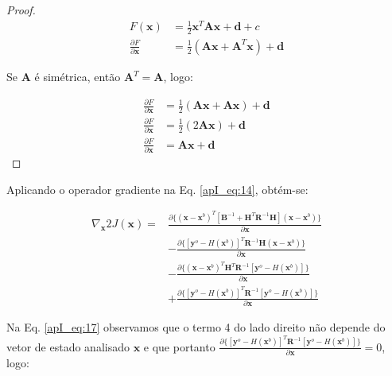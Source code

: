 \begin{proof}
\begin{align*}
    F(\mathbf{x}) &= \frac{1}{2}\mathbf{x}^{T}\mathbf{A}\mathbf{x} + \mathbf{d} + c \\
    \frac{\partial F}{\partial \mathbf{x}} &= \frac{1}{2}(\mathbf{A}\mathbf{x} + \mathbf{A}^{T}\mathbf{x}) + \mathbf{d}
\end{align*}


Se $\mathbf{A}$ é simétrica, então $\mathbf{A}^{T} = \mathbf{A}$, logo:

\begin{align*}
    \frac{\partial F}{\partial \mathbf{x}} &= \frac{1}{2}(\mathbf{A}\mathbf{x} + \mathbf{A}\mathbf{x}) + \mathbf{d} \\
    \frac{\partial F}{\partial \mathbf{x}} &= \frac{1}{2}(2\mathbf{A}\mathbf{x}) + \mathbf{d} \\
    \frac{\partial F}{\partial \mathbf{x}} &= \mathbf{A}\mathbf{x} + \mathbf{d}
\end{align*}
\end{proof}

Aplicando o operador gradiente na Eq. \ref{apI_eq:14}, obtém-se:

\begin{equation}
  \label{apI_eq:17}
  \begin{aligned}
    \nabla_{\mathbf{x}}{2J(\mathbf{x})} = {} &\frac{\partial \lbrace(\mathbf{x} - \mathbf{x}^{b})^{T}[\mathbf{B}^{-1} + \mathbf{H}^{T}\mathbf{R}^{-1}\mathbf{H}](\mathbf{x} - \mathbf{x}^{b})\rbrace}{\partial \mathbf{x}} \\
                & - \frac{\partial \lbrace[\mathbf{y}^{o} - \textit{H}(\mathbf{x}^{b})]^{T}\mathbf{R}^{-1}\mathbf{H}(\mathbf{x} - \mathbf{x}^{b})\rbrace}{\partial \mathbf{x}} \\
                & - \frac{\partial \lbrace(\mathbf{x} - \mathbf{x}^{b})^{T}\mathbf{H}^{T}\mathbf{R}^{-1}[\mathbf{y}^{o} - \textit{H}(\mathbf{x}^{b})]\rbrace}{\partial \mathbf{x}} \\
                & + \frac{\partial \lbrace[\mathbf{y}^{o} - \textit{H}(\mathbf{x}^{b})]^{T}\mathbf{R}^{-1}[\mathbf{y}^{o} - \textit{H}(\mathbf{x}^{b})]\rbrace}{\partial \mathbf{x}}
  \end{aligned}  
\end{equation}

Na Eq. \ref{apI_eq:17} observamos que o termo 4 do lado direito não depende do vetor de estado analisado $\mathbf{x}$ e que portanto $\frac{\partial \lbrace[\mathbf{y}^{o} - \textit{H}(\mathbf{x}^{b})]^{T}\mathbf{R}^{-1}[\mathbf{y}^{o} - \textit{H}(\mathbf{x}^{b})]\rbrace}{\partial \mathbf{x}} = 0$, logo:


